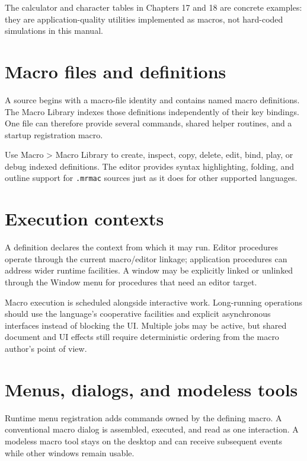 \documentclass[a4paper,10pt,twoside,openany]{book}
\makeatletter
\newcommand{\menu}[1]{\textsf{#1}\index{#1@\textsf{#1}}}
\makeatother
\begin{document}
The calculator and character tables in Chapters 17 and 18 are concrete
examples: they are application-quality utilities implemented as macros, not
hard-coded simulations in this manual.

\section{Macro files and definitions}

A source begins with a macro-file identity and contains named macro
definitions. The Macro Library indexes those definitions independently of
their key bindings. One file can therefore provide several commands, shared
helper routines, and a startup registration macro.

Use \menu{Macro > Macro Library} to create, inspect, copy, delete, edit, bind,
play, or debug indexed definitions. The editor provides syntax highlighting,
folding, and outline support for \texttt{.mrmac} sources just as it does for
other supported languages.

\section{Execution contexts}

A definition declares the context from which it may run. Editor procedures
operate through the current macro/editor linkage; application procedures can
address wider runtime facilities. A window may be explicitly linked or
unlinked through the Window menu for procedures that need an editor target.

Macro execution is scheduled alongside interactive work. Long-running
operations should use the language's cooperative facilities and explicit
asynchronous interfaces instead of blocking the UI. Multiple jobs may be
active, but shared document and UI effects still require deterministic
ordering from the macro author's point of view.

\section{Menus, dialogs, and modeless tools}

Runtime menu registration adds commands owned by the defining macro. A
conventional macro dialog is assembled, executed, and read as one interaction.
A modeless macro tool stays on the desktop and can receive subsequent events
while other windows remain usable.
\end{document}
